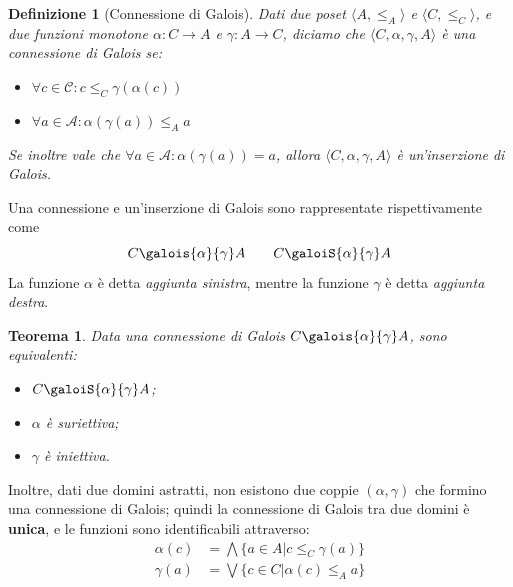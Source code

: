 \documentclass{article}
\newcommand{\galoistuple}{\langle C, \alpha, \gamma , A \rangle}
\newtheorem{definit}{Definizione}[subsection]
\newtheorem{thm}{Teorema}[subsection]
\begin{document}
            \begin{definit}[Connessione di Galois]
                Dati due poset $\langle A , \leq_A \rangle$ e $\langle C , \leq_C \rangle$, e due funzioni monotone $\alpha: C \to A$ e $\gamma: A \to C$, diciamo che $\galoistuple$ è una connessione di Galois se:
                \begin{itemize}
                    \item $\forall c \in \mathcal{C}: c \leq_C \gamma(\alpha(c))$
                    \item $\forall a \in \mathcal{A}: \alpha(\gamma(a)) \leq_A a$
                \end{itemize}
                
                Se inoltre vale che $\forall a \in \mathcal{A}: \alpha(\gamma(a)) = a$, allora $\galoistuple$ è un'inserzione di Galois.
            \end{definit}
            Una connessione e un'inserzione di Galois sono rappresentate rispettivamente come \[  C \galois{\alpha}{\gamma} A \qquad C \galoiS{\alpha}{\gamma} A \]
            La funzione $\alpha$ è detta \textit{aggiunta sinistra}, mentre la funzione $\gamma$ è detta \textit{aggiunta destra}.
            
            \begin{thm}
                Data una connessione di Galois $ C \galois{\alpha}{\gamma} A$, sono equivalenti:
                \begin{itemize}
                    \item $C \galoiS{\alpha}{\gamma} A$;
                    \item $\alpha$ è suriettiva;
                    \item $\gamma$ è iniettiva.
                \end{itemize}
            \end{thm}

            Inoltre, dati due domini astratti, non esistono due coppie $(\alpha, \gamma)$ che formino una connessione di Galois; quindi la connessione di Galois tra due domini è \textbf{unica}, e le funzioni sono identificabili attraverso:
            \begin{align*}
                \alpha(c) &= \bigwedge \lbrace a \in A \vert c \leq_C \gamma(a) \rbrace \\
                \gamma(a) &= \bigvee \lbrace c \in C \vert \alpha(c) \leq_A a \rbrace
            \end{align*}
	
\end{document}
